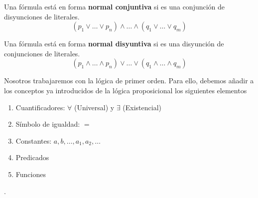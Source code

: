 \begin{Def}
  Una fórmula está en forma \textbf{normal conjuntiva} si es una conjunción de
  disyunciones de literales.
  $$(p_1\vee \dots \vee p_n)\wedge \dots \wedge (q_1\vee \dots \vee q_m)$$
\end{Def}

\begin{Def}
  Una fórmula está en forma \textbf{normal disyuntiva} si es una disyunción de
  conjunciones de literales.
  $$(p_1 \wedge \dots \wedge p_n)\vee \dots \vee (q_1\wedge \dots \wedge q_m)$$
\end{Def}

Nosotros trabajaremos con la lógica de primer orden. Para ello, debemos añadir
a los conceptos ya introducidos de la lógica proposicional los siguientes
elementos
\begin{enumerate}
\item Cuantificadores: $\forall$ (Universal) y $\exists$ (Existencial)
\item Símbolo de igualdad: $=$
\item Constantes: $a,b,\dots,a_1,a_2,\dots$
\item Predicados
\item Funciones
\end{enumerate}
.

